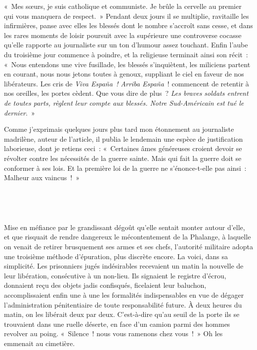 \documentclass[french,twoside]{book} %
\newcommand{\astertri}{\medskip\par\centerline{\color{rubric}\large\selectfont{\syms ✻\,✻\,✻}}\medskip\par}%
\begin{document}
« Mes sœurs, je suis catholique et communiste. Je brûle la cervelle au premier qui vous manquera de respect. » Pendant deux jours il se multiplie, ravitaille les infirmières, panse avec elles les blessés dont le nombre s’accroît sans cesse, et dans les rares moments de loisir poursuit avec la supérieure une controverse cocasse qu’elle rapporte au journaliste sur un ton d’humour assez touchant. Enfin l’aube du troisième jour commence à poindre, et la religieuse terminait ainsi son récit : « Nous entendons une vive fusillade, les blessés s’inquiètent, les miliciens partent en courant, nous nous jetons toutes à genoux, suppliant le ciel en faveur de nos libérateurs. Les cris de \emph{Viva España ! Arriba España} ! commencent de retentir à nos oreilles, les portes cèdent. Que vous dire de plus ? \emph{Les braves soldats entrent de toutes parts, règlent leur compte aux blessés. Notre Sud-Américain est tué le dernier}. »\par
Comme j’exprimais quelques jours plus tard mon étonnement au journaliste madrilène, auteur de l’article, il publia le lendemain une espèce de justification laborieuse, dont je retiens ceci : « Certaines âmes généreuses croient devoir se révolter contre les nécessités de la guerre sainte. Mais qui fait la guerre doit se conformer à ses lois. Et la première loi de la guerre ne s’énonce-t-elle pas ainsi : Malheur aux vaincus ! »\par
 \par

\astertri

\noindent  \par
Mise en méfiance par le grandissant dégoût qu’elle sentait monter autour d’elle, et que risquait de rendre dangereux le mécontentement de la Phalange, à laquelle on venait de retirer brusquement ses armes et ses chefs, l’autorité militaire adopta une troisième méthode d’épuration, plus discrète encore. La voici, dans sa simplicité. Les prisonniers jugés indésirables recevaient un matin la nouvelle de leur libération, consécutive à un non-lieu. Ils signaient le registre d’écrou, donnaient reçu des objets jadis confisqués, ficelaient leur baluchon, accomplissaient enfin une à une les formalités indispensables en vue de dégager l’administration pénitentiaire de toute responsabilité future. À deux heures du matin, on les libérait deux par deux. C’est-à-dire qu’au seuil de la porte ils se trouvaient dans une ruelle déserte, en face d’un camion parmi des hommes revolver au poing. « Silence ! nous vous ramenons chez vous ! » Oh les emmenait au cimetière.\par
 \par
\end{document}
